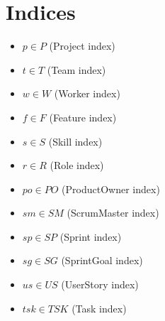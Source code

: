 \documentclass{article}
\begin{document}
\section{Indices}
\begin{itemize}
    \item $p \in P$ (Project index)
    \item $t \in T$ (Team index)
    \item $w \in W$ (Worker index)
    \item $f \in F$ (Feature index)
    \item $s \in S$ (Skill index)
    \item $r \in R$ (Role index)
    \item $po \in PO$ (ProductOwner index)
    \item $sm \in SM$ (ScrumMaster index)
    \item $sp \in SP$ (Sprint index)
    \item $sg \in SG$ (SprintGoal index)
    \item $us \in US$ (UserStory index)
    \item $tsk \in TSK$ (Task index)
\end{itemize}
\end{document}
